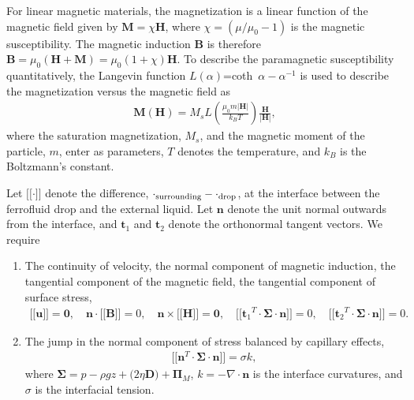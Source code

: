 For linear magnetic materials, the magnetization is a linear function of the magnetic field given 
by  ${\mathbf M} = \chi {\mathbf H}$,
where $\chi= (\mu/\mu_0 - 1)$ is the magnetic susceptibility. 
The magnetic induction ${\mathbf B}$ is therefore  
${\mathbf B}=\mu_0({\mathbf H}+{\mathbf M})=\mu_0(1+\chi){\mathbf H}$. 
To describe the paramagnetic susceptibility quantitatively, the Langevin function
 $L(\alpha)$=coth~$\alpha-\alpha^{-1}$  is used to describe the magnetization 
versus the magnetic field as 
\begin{eqnarray}
{\mathbf M} ({\mathbf H}) = M_s L\left(\frac{\mu_0 m |{\mathbf H}|}{k_B T}\right)\frac{{\mathbf H}}{|{\mathbf H}|}, \label{langevin1}
\end{eqnarray} 
where the saturation magnetization, $M_s$, and the magnetic moment of the particle, $m$,
enter as parameters, $T$ denotes the temperature, and $k_B$ is the Boltzmann's constant.

Let $\lbrack\!\lbrack \cdot \rbrack\!\rbrack$ denote the difference, $\cdot_{\rm surrounding}-\cdot_{\rm drop}$,  at the 
interface between the ferrofluid drop and the external liquid. Let ${\mathbf n}$ denote the unit normal 
outwards from the interface, and ${\mathbf t_1}$ and ${\mathbf t_2}$ denote the orthonormal tangent vectors. We 
require 
\begin{enumerate}
\item The continuity of velocity, the normal component of magnetic induction, the tangential component of 
the magnetic field, the tangential component of surface stress, 
\begin{eqnarray}
\lbrack\!\lbrack {\mathbf u}\rbrack\!\rbrack ={\mathbf 0},\quad
{\mathbf n}\cdot \lbrack\!\lbrack {\mathbf B}\rbrack\!\rbrack =0,\quad
{\mathbf n}\times \lbrack\!\lbrack {\mathbf H} \rbrack\!\rbrack ={\mathbf 0},\quad
 \lbrack\!\lbrack {\mathbf t_1}^T \cdot {\mathbf \Sigma}  \cdot {\mathbf n}  \rbrack\!\rbrack = 0,\quad
\lbrack\!\lbrack {\mathbf t_2}^T  \cdot {\mathbf \Sigma}   \cdot {\mathbf n} \rbrack\!\rbrack = 0.\nonumber
\end{eqnarray}

\item The jump in the normal component of stress balanced by capillary effects,
\begin{eqnarray}
\lbrack\!\lbrack {\mathbf n}^T \cdot {\mathbf \Sigma}  \cdot {\mathbf n} \rbrack\!\rbrack = 
\sigma k ,\nonumber
\end{eqnarray}
where ${\mathbf \Sigma}  = p - \rho g z + \bigl(2\eta {\mathbf D} \bigr) + {\mathbf \Pi}_M$,  
$k = -\nabla \cdot {\mathbf n}$ is the interface curvatures, and $\sigma$ 
is the interfacial tension.
\end{enumerate}





